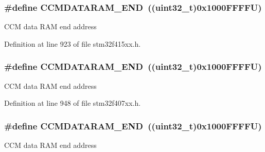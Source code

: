 \subsubsection[{\texorpdfstring{C\+C\+M\+D\+A\+T\+A\+R\+A\+M\+\_\+\+E\+ND}{CCMDATARAM_END}}]{\setlength{\rightskip}{0pt plus 5cm}\#define C\+C\+M\+D\+A\+T\+A\+R\+A\+M\+\_\+\+E\+ND~((uint32\+\_\+t)0x1000\+F\+F\+F\+F\+U)}\hypertarget{group___peripheral__registers__structures_ga9fbe263946209e6f09faf93512bd2f9a}{}\label{group___peripheral__registers__structures_ga9fbe263946209e6f09faf93512bd2f9a}
C\+CM data R\+AM end address 

Definition at line 923 of file stm32f415xx.\+h.

\subsubsection[{\texorpdfstring{C\+C\+M\+D\+A\+T\+A\+R\+A\+M\+\_\+\+E\+ND}{CCMDATARAM_END}}]{\setlength{\rightskip}{0pt plus 5cm}\#define C\+C\+M\+D\+A\+T\+A\+R\+A\+M\+\_\+\+E\+ND~((uint32\+\_\+t)0x1000\+F\+F\+F\+F\+U)}\hypertarget{group___peripheral__registers__structures_ga9fbe263946209e6f09faf93512bd2f9a}{}\label{group___peripheral__registers__structures_ga9fbe263946209e6f09faf93512bd2f9a}
C\+CM data R\+AM end address 

Definition at line 948 of file stm32f407xx.\+h.

\subsubsection[{\texorpdfstring{C\+C\+M\+D\+A\+T\+A\+R\+A\+M\+\_\+\+E\+ND}{CCMDATARAM_END}}]{\setlength{\rightskip}{0pt plus 5cm}\#define C\+C\+M\+D\+A\+T\+A\+R\+A\+M\+\_\+\+E\+ND~((uint32\+\_\+t)0x1000\+F\+F\+F\+F\+U)}\hypertarget{group___peripheral__registers__structures_ga9fbe263946209e6f09faf93512bd2f9a}{}\label{group___peripheral__registers__structures_ga9fbe263946209e6f09faf93512bd2f9a}
C\+CM data R\+AM end address 

